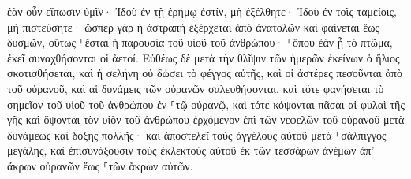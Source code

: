 \documentclass{openreader}
\begin{document}
ἐὰν οὖν εἴπωσιν ὑμῖν· Ἰδοὺ ἐν τῇ ἐρήμῳ ἐστίν, μὴ ἐξέλθητε· Ἰδοὺ ἐν τοῖς ταμείοις, μὴ πιστεύσητε· 
ὥσπερ γὰρ ἡ ἀστραπὴ ἐξέρχεται ἀπὸ ἀνατολῶν καὶ φαίνεται ἕως δυσμῶν, οὕτως ⸀ἔσται ἡ παρουσία τοῦ υἱοῦ τοῦ ἀνθρώπου· 
⸀ὅπου ἐὰν ᾖ τὸ πτῶμα, ἐκεῖ συναχθήσονται οἱ ἀετοί. 
Εὐθέως δὲ μετὰ τὴν θλῖψιν τῶν ἡμερῶν ἐκείνων ὁ ἥλιος σκοτισθήσεται, καὶ ἡ σελήνη οὐ δώσει τὸ φέγγος αὐτῆς, καὶ οἱ ἀστέρες πεσοῦνται ἀπὸ τοῦ οὐρανοῦ, καὶ αἱ δυνάμεις τῶν οὐρανῶν σαλευθήσονται. 
καὶ τότε φανήσεται τὸ σημεῖον τοῦ υἱοῦ τοῦ ἀνθρώπου ἐν ⸀τῷ οὐρανῷ, καὶ τότε κόψονται πᾶσαι αἱ φυλαὶ τῆς γῆς καὶ ὄψονται τὸν υἱὸν τοῦ ἀνθρώπου ἐρχόμενον ἐπὶ τῶν νεφελῶν τοῦ οὐρανοῦ μετὰ δυνάμεως καὶ δόξης πολλῆς· 
καὶ ἀποστελεῖ τοὺς ἀγγέλους αὐτοῦ μετὰ ⸀σάλπιγγος μεγάλης, καὶ ἐπισυνάξουσιν τοὺς ἐκλεκτοὺς αὐτοῦ ἐκ τῶν τεσσάρων ἀνέμων ἀπ’ ἄκρων οὐρανῶν ἕως ⸀τῶν ἄκρων αὐτῶν. 
\end{document}
